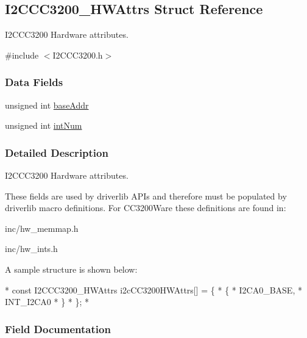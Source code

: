 \subsection{I2\-C\-C\-C3200\-\_\-\-H\-W\-Attrs Struct Reference}
\label{struct_i2_c_c_c3200___h_w_attrs}


I2\-C\-C\-C3200 Hardware attributes.  




{\ttfamily \#include $<$I2\-C\-C\-C3200.\-h$>$}

\subsubsection*{Data Fields}
\begin{DoxyCompactItemize}
\item 
unsigned int \hyperlink{struct_i2_c_c_c3200___h_w_attrs_aad58884ee0e40e6b4eda27d212c0339b}{base\-Addr}
\item 
unsigned int \hyperlink{struct_i2_c_c_c3200___h_w_attrs_a944246733bda012f41d4eb1b9b4b3b8b}{int\-Num}
\end{DoxyCompactItemize}


\subsubsection{Detailed Description}
I2\-C\-C\-C3200 Hardware attributes. 

These fields are used by driverlib A\-P\-Is and therefore must be populated by driverlib macro definitions. For C\-C3200\-Ware these definitions are found in\-:
\begin{DoxyItemize}
\item inc/hw\-\_\-memmap.\-h
\item inc/hw\-\_\-ints.\-h
\end{DoxyItemize}

A sample structure is shown below\-: 
\begin{DoxyCode}
*  \textcolor{keyword}{const} I2CCC3200_HWAttrs i2cCC3200HWAttrs[] = \{
*      \{
*          I2CA0\_BASE,
*          INT\_I2CA0
*      \}
*  \};
*  
\end{DoxyCode}
 

\subsubsection{Field Documentation}
